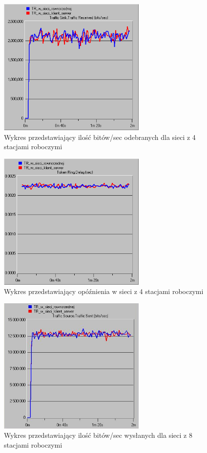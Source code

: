 \documentclass{article}
\begin{document}
\begin{figure}[H]
  \centering
  \includegraphics[width=0.65\textwidth]{screens/4_recv.png}
 \caption{Wykres przedstawiający ilość bitów/sec odebranych dla sieci z 4 stacjami roboczymi}
 \label{fig:4r}
\end{figure}

\begin{figure}[H]
  \centering
  \includegraphics[width=0.65\textwidth]{screens/4_delay.png}
 \caption{Wykres przedstawiający opóźnienia w sieci z 4 stacjami roboczymi}
 \label{fig:4d}
\end{figure}


\begin{figure}[H]
  \centering
  \includegraphics[width=0.65\textwidth]{screens/8_sent.png}
 \caption{Wykres przedstawiający ilość bitów/sec wysłanych dla sieci z 8 stacjami roboczymi}
 \label{fig:8s}
\end{figure}
\end{document}
